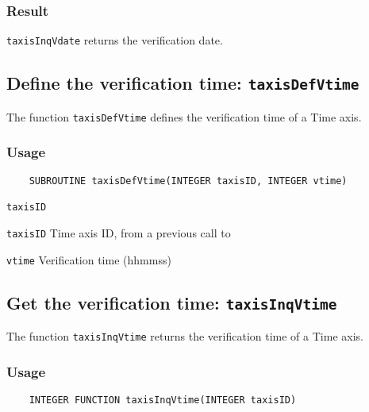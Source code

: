 \subsubsection*{Result}

{\texttt{taxisInqVdate}} returns the verification date.



\subsection{Define the verification time: \texttt{taxisDefVtime}}
\label{taxisDefVtime}

The function {\texttt{taxisDefVtime}} defines the verification time of a Time axis.

\subsubsection*{Usage}

\begin{verbatim}
    SUBROUTINE taxisDefVtime(INTEGER taxisID, INTEGER vtime)
\end{verbatim}

\hspace*{4mm}\begin{minipage}[]{15cm}
\begin{deflist}{\texttt{taxisID}\ }
\item[\texttt{taxisID}]
Time axis ID, from a previous call to {}
\item[\texttt{vtime}]
Verification time (hhmmss)

\end{deflist}
\end{minipage}


\subsection{Get the verification time: \texttt{taxisInqVtime}}
\label{taxisInqVtime}

The function {\texttt{taxisInqVtime}} returns the verification time of a Time axis.

\subsubsection*{Usage}

\begin{verbatim}
    INTEGER FUNCTION taxisInqVtime(INTEGER taxisID)
\end{verbatim}

